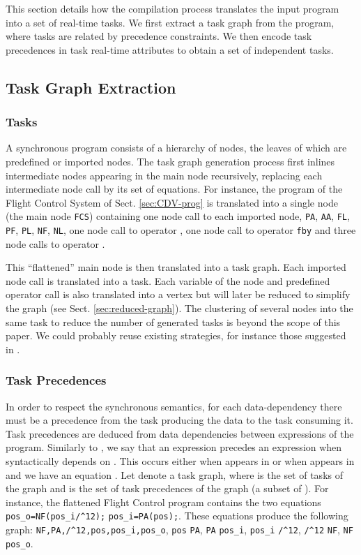 \label{sec:task-translation}

This section details how the compilation process translates the input
program into a set of real-time tasks. We first extract a task graph
from the program, where tasks are related by precedence constraints. We
then encode task precedences in task real-time attributes to obtain a
set of independent tasks.

\subsection{Task Graph Extraction}
\label{sec:extraction}
\subsubsection{Tasks}

A synchronous program consists of a hierarchy of nodes, the leaves of
which are predefined or imported nodes. The task graph generation
process first inlines intermediate nodes appearing in the main node
recursively, replacing each intermediate node call by its set of
equations. For instance, the program of the Flight Control System of
Sect. \ref{sec:CDV-prog} is translated into a single node (the main node
\lstinline!FCS!) containing one node call to each imported node,
\lstinline!PA!, \lstinline!AA!, \lstinline!FL!,
\lstinline!PF!, \lstinline!PL!, \lstinline!NF!, \lstinline!NL!, one node
call to operator , one node call to operator \lstinline!fby!
and three node calls to operator .

This ``flattened'' main node is then translated into a task graph. Each
imported node call is translated into a task. Each variable of the node
and predefined operator call is also translated into a vertex but will
later be reduced to simplify the graph (see
Sect. \ref{sec:reduced-graph}). The clustering of several nodes into the
same task to reduce the number of generated tasks is
beyond the scope of this paper. We could probably reuse existing
strategies, for instance those suggested in \cite{curic05}.

\subsubsection{Task Precedences}
In order to respect the synchronous semantics, for each data-dependency there
must be a precedence from the task producing the data to the task
consuming it. Task precedences are deduced from data dependencies
between expressions of the program. Similarly to \cite{halbwachs91b}, we
say that an expression  precedes an expression  when 
syntactically depends on . This occurs either when  appears in
 or when  appears in  and we have an equation . Let
 denote a task graph, where  is the set of tasks of the
graph and  is the set of task precedences of the graph (a subset of
). For instance, the flattened Flight Control program
contains the two equations \lstinline!pos_o=NF(pos_i/^12);!
\lstinline!pos_i=PA(pos);!. These equations produce the following graph:
\lstinline!NF,PA,/^12,pos,pos_i,pos_o!,
\lstinline!pos! \lstinline!PA!, \lstinline!PA!
\lstinline!pos_i!, \lstinline!pos_i! \lstinline!/^12!,
\lstinline!/^12! \lstinline!NF!, \lstinline!NF!  
\lstinline!pos_o!.

